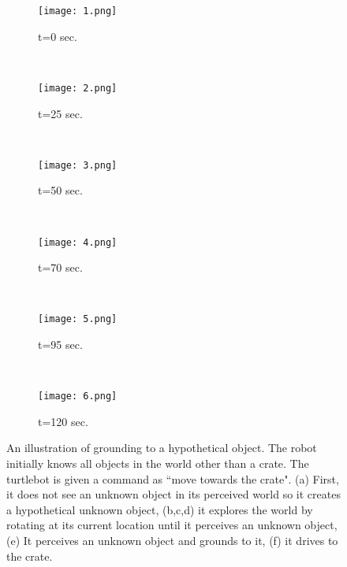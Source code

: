 \begin{figure}[h!]
\begin{subfigure}[b]{0.45\columnwidth}
\centering
\texttt{[image: 1.png]}
\caption{t=0 sec.}
\label{fig:exp1}
\end{subfigure}
~
\begin{subfigure}[b]{0.45\columnwidth}
\centering
\texttt{[image: 2.png]}
\caption{t=25 sec.}
\label{fig:exp2}
\end{subfigure}
~
\begin{subfigure}[b]{0.45\columnwidth}
\centering
\texttt{[image: 3.png]}
\caption{t=50 sec.}
\label{fig:exp3}
\end{subfigure}
~
\begin{subfigure}[b]{0.45\columnwidth}
\centering
\texttt{[image: 4.png]}
\caption{t=70 sec.}
\label{fig:exp4}
\end{subfigure}
~
\begin{subfigure}[b]{0.45\columnwidth}
\centering
\texttt{[image: 5.png]}
\caption{t=95 sec.}
\label{fig:exp5}
\end{subfigure}
~~~~~~~
\begin{subfigure}[b]{0.45\columnwidth}
\centering
\texttt{[image: 6.png]}
\caption{t=120 sec. }
\label{fig:exp6}
\end{subfigure}
\caption{An illustration of grounding to a hypothetical object. The robot initially knows all objects in the world other than a crate. The turtlebot is given a command as ``move towards the crate". (a) First, it does not see an unknown object in its perceived world so it creates a hypothetical unknown object, (b,c,d) it explores the world by rotating at its current location until it perceives an unknown object, (e) It perceives an unknown object and grounds to it, (f) it drives to the crate.}
\label{fig:crate}
\end{figure}


